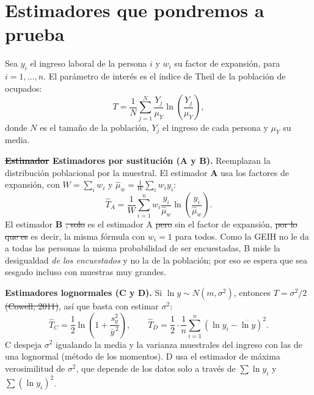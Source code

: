 \documentclass[12pt,letterpaper]{article}
\providecommand{\DIFaddtex}[1]{{\protect\color{BLUE}#1}} %
\providecommand{\DIFdeltex}[1]{{\protect\color{RED}\sout{#1}}} %
\providecommand{\DIFaddtex}[1]{\texorpdfstring{\DIFaddtex{#1}}{#1}} %
\providecommand{\DIFdeltex}[1]{\texorpdfstring{\DIFdeltex{#1}}{}} %
\providecommand{\DIFaddbegin}{}\providecommand{\DIFaddend}{} %
\providecommand{\DIFdelbegin}{}\providecommand{\DIFdelend}{} %
\providecommand{\DIFadd}[1]{\texorpdfstring{\DIFaddtex{#1}}{#1}} %
\providecommand{\DIFdel}[1]{\texorpdfstring{\DIFdeltex{#1}}{}} %
\begin{document}
\section{Estimadores que pondremos a prueba}

Sea $y_i$ el ingreso laboral de la persona $i$ y $w_i$ su factor de expansión, para $i = 1, \dots, n$. El parámetro de interés es el índice de Theil de la población de ocupados:
\begin{equation}
  T = \frac{1}{N}\sum_{j=1}^{N} \frac{Y_j}{\mu_Y}\ln\!\left(\frac{Y_j}{\mu_Y}\right),
\end{equation}
donde $N$ es el tamaño de la población, $Y_j$ el ingreso de cada persona y $\mu_Y$ su media.

\textbf{\DIFdelbegin \DIFdel{Estimador }\DIFdelend \DIFaddbegin \DIFadd{Estimadores por sustitución (}\DIFaddend A \DIFaddbegin \DIFadd{y B)}\DIFaddend .} Reemplazan la distribución poblacional por la muestral. El estimador \textbf{A} usa los factores de expansión, con $W = \sum_i w_i$ y $\hat{\mu}_w = \frac{1}{W}\sum_i w_i y_i$:
\begin{equation}
  \hat{T}_A = \frac{1}{W}\sum_{i=1}^{n} w_i \frac{y_i}{\hat{\mu}_w}\ln\!\left(\frac{y_i}{\hat{\mu}_w}\right).
\end{equation}
El estimador \textbf{B} \DIFdelbegin \DIFdel{, solo }\DIFdelend es el estimador A \DIFdelbegin \DIFdel{pero }\DIFdelend sin el factor de expansión, \DIFdelbegin \DIFdel{por lo que es }\DIFdelend \DIFaddbegin \DIFadd{es decir, }\DIFaddend la misma fórmula con $w_i = 1$ para todos. Como la GEIH no le da a todas las personas la misma probabilidad de ser encuestadas, B mide la desigualdad \emph{de los encuestados} y no la de la población; por eso se espera que sea sesgado incluso con muestras muy grandes.

\textbf{Estimadores lognormales (C y D).} Si $\ln y \sim N(m, \sigma^2)$, entonces $T = \sigma^2/2$ \DIFdelbegin \DIFdel{(Cowell, 2011)}\DIFdelend \DIFaddbegin \parencite{cowell2011measuring}\DIFaddend , así que basta con estimar $\sigma^2$:
\begin{equation}
  \hat{T}_C = \frac{1}{2}\ln\!\left(1 + \frac{s_y^2}{\bar{y}^{\,2}}\right),
  \qquad
  \hat{T}_D = \frac{1}{2}\cdot\frac{1}{n}\sum_{i=1}^{n}\left(\ln y_i - \overline{\ln y}\right)^2 .
\end{equation}
C despeja $\sigma^2$ igualando la media y la varianza muestrales del ingreso con las de una lognormal (método de los momentos). D usa el estimador de máxima verosimilitud \DIFaddbegin \DIFadd{de $\sigma^2$, que depende de los datos solo a través de $\sum \ln y_i$ y $\sum (\ln y_i)^2$}\DIFaddend .
\end{document}
